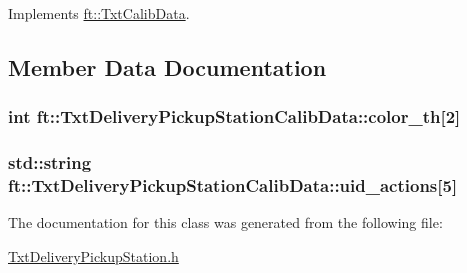 Implements \hyperlink{classft_1_1_txt_calib_data_aace95b90ba43836acbd8f0cf1dd323c7}{ft\+::\+Txt\+Calib\+Data}.



\subsection{Member Data Documentation}
\subsubsection[{\texorpdfstring{color\+\_\+th}{color_th}}]{\setlength{\rightskip}{0pt plus 5cm}int ft\+::\+Txt\+Delivery\+Pickup\+Station\+Calib\+Data\+::color\+\_\+th\mbox{[}2\mbox{]}}\hypertarget{classft_1_1_txt_delivery_pickup_station_calib_data_a35809cf5b3c77bbcbf2c36c7905d286f}{}\label{classft_1_1_txt_delivery_pickup_station_calib_data_a35809cf5b3c77bbcbf2c36c7905d286f}
\subsubsection[{\texorpdfstring{uid\+\_\+actions}{uid_actions}}]{\setlength{\rightskip}{0pt plus 5cm}std\+::string ft\+::\+Txt\+Delivery\+Pickup\+Station\+Calib\+Data\+::uid\+\_\+actions\mbox{[}5\mbox{]}}\hypertarget{classft_1_1_txt_delivery_pickup_station_calib_data_a4cd1ea7a4ffc6e5a66d7cab90be86bb0}{}\label{classft_1_1_txt_delivery_pickup_station_calib_data_a4cd1ea7a4ffc6e5a66d7cab90be86bb0}


The documentation for this class was generated from the following file\+:\begin{DoxyCompactItemize}
\item 
\hyperlink{_txt_delivery_pickup_station_8h}{Txt\+Delivery\+Pickup\+Station.\+h}\end{DoxyCompactItemize}
